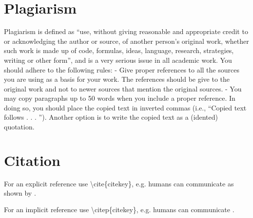 \section{Plagiarism}
Plagiarism is defined as “use, without giving reasonable and appropriate credit to or acknowledging the author or source, of another person’s original work, whether such work is made up of code, formulas, ideas, language, research, strategies, writing or other form”, and is a very serious issue in all academic work. You should adhere to the following rules:
- Give proper references to all the sources you are using as a basis for your work. The references should be give to the original work and not to newer sources that mention the original sources.
- You may copy paragraphs up to 50 words when you include a proper reference. In doing so, you should place the copied text in inverted commas (i.e., “Copied text follows . . . ”). Another option is to write the copied text as a (idented) quotation.

\section{Citation}

For an explicit reference use \textbackslash cite\{citekey\}, e.g. humans can communicate as shown by \cite{winograd1972understanding}.

For an implicit reference use \textbackslash citep\{citekey\}, e.g. humans can communicate \citep{gregory1987oxford}.